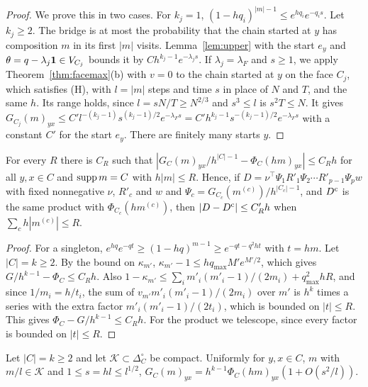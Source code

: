 \begin{proof}
We prove this in two cases. For $k_j=1$, $(1-hq_i)^{|m|-1}\le e^{hq_i}e^{-q_is}$. Let $k_j\ge2$. The bridge is at most the
probability that the chain started at $y$ has composition $m$ in its first $|m|$ visits.
Lemma~\ref{lem:upper} with the start $e_y$ and $\theta=q-\lambda_j\mathbf{1}\in V_{C_j}$ bounds it by
$Ch^{k_j-1}e^{-\lambda_js}$. If $\lambda_j=\lambda_F$ and $s\ge1$, we apply
Theorem~\ref{thm:facemax}(b) with $v=0$ to the chain started at $y$ on the face $C_j$, which
satisfies (H), with $l=|m|$ steps and time $s$ in place of $N$ and $T$, and the same $h$. Its
range holds, since $l=sN/T\ge N^{2/3}$ and $s^3\le l$ is $s^2T\le N$. It gives
$G_{C_j}(m)_{yx}\le C'l^{-(k_j-1)}s^{(k_j-1)/2}e^{-\lambda_Fs}=C'h^{k_j-1}s^{-(k_j-1)/2}e^{-\lambda_Fs}$
with a constant $C'$ for the start $e_y$. There are finitely many starts $y$.
\end{proof}

\begin{lemma}\label{lem:block-short}
For every $R$ there is $C_R$ such that $|G_C(m)_{yx}/h^{|C|-1}-\Phi_C(hm)_{yx}|\le C_Rh$ for all
$y,x\in C$ and $\operatorname{supp} m=C$ with $h|m|\le R$. Hence, if $D=\nu^\top\Psi_1R'_1\Psi_2\cdots R'_{p-1}\Psi_pw$
with fixed nonnegative $\nu$, $R'_c$ and $w$ and $\Psi_c=G_{C_c}(m^{(c)})/h^{|C_c|-1}$, and $D^{\rm c}$
is the same product with $\Phi_{C_c}(hm^{(c)})$, then $|D-D^{\rm c}|\le C'_Rh$ when
$\sum_ch|m^{(c)}|\le R$.
\end{lemma}

\begin{proof}
For a singleton, $e^{hq}e^{-qt}\ge(1-hq)^{m-1}\ge e^{-qt-q^2ht}$ with $t=hm$. Let $|C|=k\ge2$.
By the bound on $\kappa_{m'}$, $\kappa_{m'}-1\le hq_{\max}M'e^{M'/2}$, which gives
$G/h^{k-1}-\Phi_C\le C_Rh$. Also $1-\kappa_{m'}\le\sum_im'_i(m'_i-1)/(2m_i)+q_{\max}^2hR$, and
since $1/m_i=h/t_i$, the sum of $v_{m'}m'_i(m'_i-1)/(2m_i)$ over $m'$ is $h^k$ times a series with
the extra factor $m'_i(m'_i-1)/(2t_i)$, which is bounded on $|t|\le R$. This gives
$\Phi_C-G/h^{k-1}\le C_Rh$. For the product we telescope, since every factor is bounded
on $|t|\le R$.
\end{proof}

\begin{lemma}\label{lem:block-local}
Let $|C|=k\ge2$ and let $\mathcal K\subset\Delta_C^\circ$ be compact. Uniformly for $y,x\in C$,
$m$ with $m/l\in\mathcal K$ and $1\le s=hl\le l^{1/2}$,
$G_C(m)_{yx}=h^{k-1}\Phi_C(hm)_{yx}(1+O(s^2/l))$.
\end{lemma}

